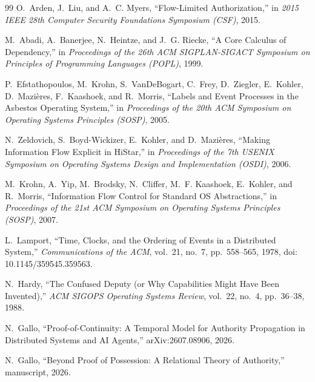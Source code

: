\documentclass[10pt,twocolumn]{article}
\begin{document}
\begin{thebibliography}{99}
O.~Arden, J.~Liu, and A.~C. Myers,
``Flow-Limited Authorization,''
in \emph{2015 IEEE 28th Computer Security Foundations Symposium (CSF)}, 2015.

M.~Abadi, A.~Banerjee, N.~Heintze, and J.~G. Riecke,
``A Core Calculus of Dependency,''
in \emph{Proceedings of the 26th ACM SIGPLAN-SIGACT Symposium on Principles of
Programming Languages (POPL)}, 1999.

P.~Efstathopoulos, M.~Krohn, S.~VanDeBogart, C.~Frey, D.~Ziegler, E.~Kohler,
D.~Mazi\`eres, F.~Kaashoek, and R.~Morris,
``Labels and Event Processes in the Asbestos Operating System,''
in \emph{Proceedings of the 20th ACM Symposium on Operating Systems Principles
(SOSP)}, 2005.

N.~Zeldovich, S.~Boyd-Wickizer, E.~Kohler, and D.~Mazi\`eres,
``Making Information Flow Explicit in HiStar,''
in \emph{Proceedings of the 7th USENIX Symposium on Operating Systems Design and
Implementation (OSDI)}, 2006.

M.~Krohn, A.~Yip, M.~Brodsky, N.~Cliffer, M.~F. Kaashoek, E.~Kohler, and
R.~Morris,
``Information Flow Control for Standard OS Abstractions,''
in \emph{Proceedings of the 21st ACM Symposium on Operating Systems Principles
(SOSP)}, 2007.

L.~Lamport,
``Time, Clocks, and the Ordering of Events in a Distributed System,''
\emph{Communications of the ACM}, vol.~21, no.~7, pp.~558--565, 1978,
doi: 10.1145/359545.359563.

N.~Hardy,
``The Confused Deputy (or Why Capabilities Might Have Been Invented),''
\emph{ACM SIGOPS Operating Systems Review}, vol.~22, no.~4, pp.~36--38, 1988.

N.~Gallo,
``Proof-of-Continuity: A Temporal Model for Authority Propagation in Distributed Systems and AI Agents,''
arXiv:2607.08906, 2026.

N.~Gallo,
``Beyond Proof of Possession: A Relational Theory of Authority,''
manuscript, 2026.

\end{thebibliography}
\end{document}

